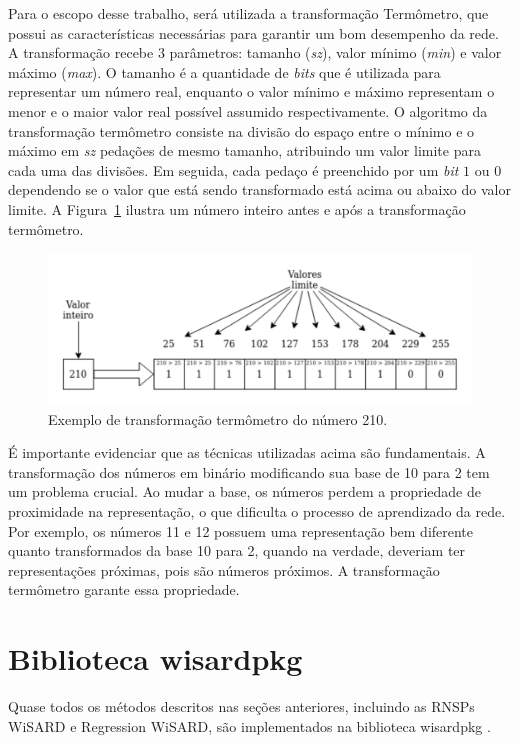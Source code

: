 Para o escopo desse trabalho, será utilizada a transformação Termômetro, que possui as características necessárias para garantir um bom desempenho da rede. A transformação recebe 3 parâmetros: tamanho (\textit{sz}), valor mínimo (\textit{min}) e valor máximo (\textit{max}). O tamanho é a quantidade de \textit{bits} que é utilizada para representar um número real, enquanto o valor mínimo e máximo representam o menor e o maior valor real possível assumido respectivamente. O algoritmo da transformação termômetro consiste na divisão do espaço entre o mínimo e o máximo em \textit{sz} pedações de mesmo tamanho, atribuindo um valor limite para cada uma das divisões. Em seguida, cada pedaço é preenchido por um \textit{bit} $1$ ou $0$ dependendo se o valor que está sendo transformado está acima ou abaixo do valor limite. A Figura~\ref{fig:therm_ex} ilustra um número inteiro antes e após a transformação termômetro.

\begin{figure}[!htp]
    \centering
    \includegraphics[width=5.0in]{img/therm_example.pdf}
    \caption{Exemplo de transformação termômetro do número 210.}
    \label{fig:therm_ex}
\end{figure}

É importante evidenciar que as técnicas utilizadas acima são fundamentais. A transformação dos números em binário modificando sua base de 10 para 2 tem um problema crucial. Ao mudar a base, os números perdem a propriedade de proximidade na representação, o que dificulta o processo de aprendizado da rede. Por exemplo, os números 11 e 12 possuem uma representação bem diferente quanto transformados da base 10 para 2, quando na verdade, deveriam ter representações próximas, pois são números próximos. A transformação termômetro garante essa propriedade.

\section{Biblioteca wisardpkg} \label{sec:wisardpkg}
Quase todos os métodos descritos nas seções anteriores, incluindo as RNSPs WiSARD e Regression WiSARD, são implementados na biblioteca wisardpkg \cite{wisardpkg}.

